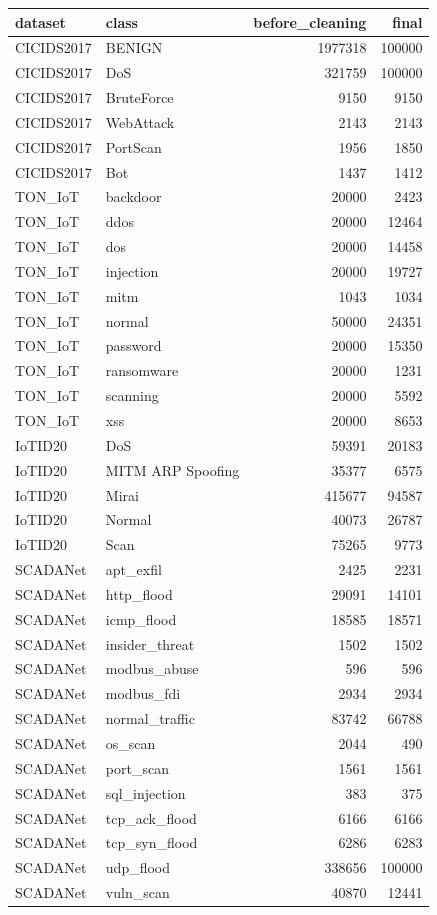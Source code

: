 \begin{tabular}{llrr}
\toprule
dataset & class & before\_cleaning & final \\
\midrule
CICIDS2017 & BENIGN & 1977318 & 100000 \\
CICIDS2017 & DoS & 321759 & 100000 \\
CICIDS2017 & BruteForce & 9150 & 9150 \\
CICIDS2017 & WebAttack & 2143 & 2143 \\
CICIDS2017 & PortScan & 1956 & 1850 \\
CICIDS2017 & Bot & 1437 & 1412 \\
TON\_IoT & backdoor & 20000 & 2423 \\
TON\_IoT & ddos & 20000 & 12464 \\
TON\_IoT & dos & 20000 & 14458 \\
TON\_IoT & injection & 20000 & 19727 \\
TON\_IoT & mitm & 1043 & 1034 \\
TON\_IoT & normal & 50000 & 24351 \\
TON\_IoT & password & 20000 & 15350 \\
TON\_IoT & ransomware & 20000 & 1231 \\
TON\_IoT & scanning & 20000 & 5592 \\
TON\_IoT & xss & 20000 & 8653 \\
IoTID20 & DoS & 59391 & 20183 \\
IoTID20 & MITM ARP Spoofing & 35377 & 6575 \\
IoTID20 & Mirai & 415677 & 94587 \\
IoTID20 & Normal & 40073 & 26787 \\
IoTID20 & Scan & 75265 & 9773 \\
SCADANet & apt\_exfil & 2425 & 2231 \\
SCADANet & http\_flood & 29091 & 14101 \\
SCADANet & icmp\_flood & 18585 & 18571 \\
SCADANet & insider\_threat & 1502 & 1502 \\
SCADANet & modbus\_abuse & 596 & 596 \\
SCADANet & modbus\_fdi & 2934 & 2934 \\
SCADANet & normal\_traffic & 83742 & 66788 \\
SCADANet & os\_scan & 2044 & 490 \\
SCADANet & port\_scan & 1561 & 1561 \\
SCADANet & sql\_injection & 383 & 375 \\
SCADANet & tcp\_ack\_flood & 6166 & 6166 \\
SCADANet & tcp\_syn\_flood & 6286 & 6283 \\
SCADANet & udp\_flood & 338656 & 100000 \\
SCADANet & vuln\_scan & 40870 & 12441 \\
\bottomrule
\end{tabular}
